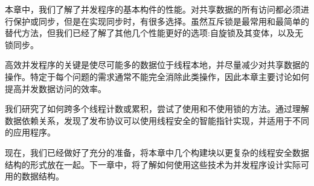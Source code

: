 本章中，我们了解了并发程序的基本构件的性能。对共享数据的所有访问都必须进行保护或同步，但是在实现同步时，有很多选择。虽然互斥锁是最常用和最简单的替代方法，但我们已经了解了其他几个性能更好的选项:自旋锁及其变体，以及无锁同步。

高效并发程序的关键是使尽可能多的数据位于线程本地，并尽量减少对共享数据的操作。特定于每个问题的需求通常不能完全消除此类操作，因此本章主要讨论如何提高并发数据访问的效率。

我们研究了如何跨多个线程计数或累积，尝试了使用和不使用锁的方法。通过理解数据依赖关系，发现了发布协议可以使用线程安全的智能指针实现，并适用于不同的应用程序。

现在，我们已经做好了充分的准备，将本章中几个构建块以更复杂的线程安全数据结构的形式放在一起。下一章中，将了解如何使用这些技术为并发程序设计实际可用的数据结构。